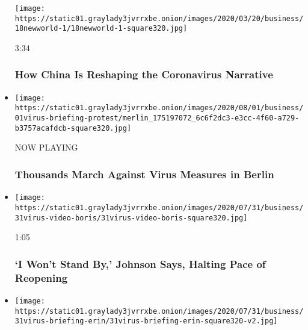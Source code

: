 \begin{itemize}
  \texttt{[image: https://static01.graylady3jvrrxbe.onion/images/2020/03/20/business/18newworld-1/18newworld-1-square320.jpg]}

  3:34

  \hypertarget{how-china-is-reshaping-the-coronavirus-narrative}{%
  \subsubsection{How China Is Reshaping the Coronavirus
  Narrative}\label{how-china-is-reshaping-the-coronavirus-narrative}}
\item
  \texttt{[image: https://static01.graylady3jvrrxbe.onion/images/2020/08/01/business/01virus-briefing-protest/merlin\_175197072\_6c6f2dc3-e3cc-4f60-a729-b3757acafdcb-square320.jpg]}

  NOW PLAYING

  \hypertarget{thousands-march-against-virus-measures-in-berlin-1}{%
  \subsubsection{Thousands March Against Virus Measures in
  Berlin}\label{thousands-march-against-virus-measures-in-berlin-1}}
\item
  \href{https://www.nytimes3xbfgragh.onion/video/us/politics/100000007266983/johnson-coronavirus-restrictions.html?action=click\&module=video-series-bar\&region=header\&pgtype=Article\&playlistId=video/coronavirus-news-update}{}

  \texttt{[image: https://static01.graylady3jvrrxbe.onion/images/2020/07/31/business/31virus-video-boris/31virus-video-boris-square320.jpg]}

  1:05

  \hypertarget{i-wont-stand-by-johnson-says-halting-pace-of-reopening}{%
  \subsubsection{`I Won't Stand By,' Johnson Says, Halting Pace of
  Reopening}\label{i-wont-stand-by-johnson-says-halting-pace-of-reopening}}
\item
  \href{https://www.nytimes3xbfgragh.onion/video/us/politics/100000007266691/fauci-congress-testimony.html?action=click\&module=video-series-bar\&region=header\&pgtype=Article\&playlistId=video/coronavirus-news-update}{}

  \texttt{[image: https://static01.graylady3jvrrxbe.onion/images/2020/07/31/business/31virus-briefing-erin/31virus-briefing-erin-square320-v2.jpg]}


\end{itemize}
